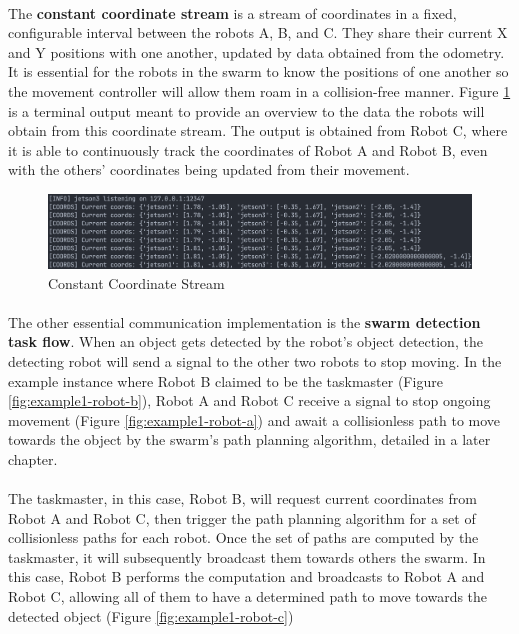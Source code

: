 \paragraph*{}
The \textbf{constant coordinate stream} is a stream of coordinates in a fixed, configurable interval between the robots A, B, and C. They share their current X and Y positions with one another, updated by data obtained from the odometry. It is essential for the robots in the swarm to know the positions of one another so the movement controller will allow them roam in a collision-free manner. Figure \ref{fig:coordinate-stream} is a terminal output meant to provide an overview to the data the robots will obtain from this coordinate stream. The output is obtained from Robot C, where it is able to continuously track the coordinates of Robot A and Robot B, even with the others' coordinates being updated from their movement.

\begin{figure} [H]
    \centering
    \includegraphics[width=1\linewidth]{assets/images/communication/coordinate-stream.png}
    \caption{Constant Coordinate Stream}
    \label{fig:coordinate-stream}
\end{figure}

\paragraph*{}
The other essential communication implementation is the \textbf{swarm detection task flow}. When an object gets detected by the robot's object detection, the detecting robot will send a signal to the other two robots to stop moving. In the example instance where Robot B claimed to be the taskmaster (Figure \ref{fig:example1-robot-b}), Robot A and Robot C receive a signal to stop ongoing movement (Figure \ref{fig:example1-robot-a}) and await a collisionless path to move towards the object by the swarm's path planning algorithm, detailed in a later chapter.

\paragraph*{}
The taskmaster, in this case, Robot B, will request current coordinates from Robot A and Robot C, then trigger the path planning algorithm for a set of collisionless paths for each robot. Once the set of paths are computed by the taskmaster, it will subsequently broadcast them towards others the swarm. In this case, Robot B performs the computation and broadcasts to Robot A and Robot C, allowing all of them to have a determined path to move towards the detected object (Figure \ref{fig:example1-robot-c})

